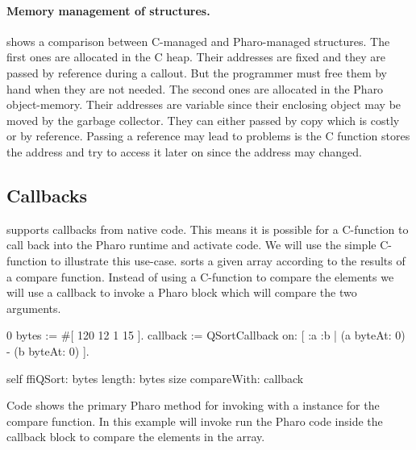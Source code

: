 \paragraph{Memory management of structures.}
 shows a comparison between C-managed and Pharo-managed structures.
The first ones are allocated in the C heap.
Their addresses are fixed and they are passed by reference during a callout.
But the programmer must free them by hand when they are not needed.
The second ones are allocated in the Pharo object-memory.
Their addresses are variable since their enclosing object may be moved by the garbage collector.
They can either passed by copy which is costly or by reference.
Passing a reference may lead to problems is the C function stores the address and try to access it later on since the address may changed.


\subsection{Callbacks}

\NB supports callbacks from native code.
This means it is possible for a C-function to call back into the Pharo runtime and activate code.
We will use the simple  C-function to illustrate this use-case.
 sorts a given array according to the results of a compare function.
Instead of using a C-function to compare the elements we will use a callback to invoke a Pharo block which will compare the two arguments.
%
\begin{stcode}[
	label={lst:calloutWithCallback},
	caption={Example of callout passing a callback for \ttt{qsort}}]{0}
bytes := #[ 120 12 1 15 ].
callback := QSortCallback on: [ :a :b |
				(a byteAt: 0) - (b byteAt: 0) ].

self ffiQSort: bytes
	 length: bytes size
	 compareWith: callback
\end{stcode}
%
Code  shows the primary Pharo method for invoking  with a  instance for the compare function.
In this example  will invoke run the Pharo code inside the callback block to compare the elements in the  array.


